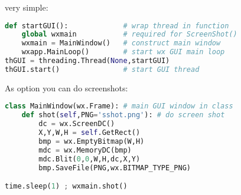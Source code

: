 very simple:
\begin{lstlisting}[language=python]
def startGUI():				# wrap thread in function
	global wxmain			# required for ScreenShot()
	wxmain = MainWindow()	# construct main window
	wxapp.MainLoop()		# start wx GUI main loop
thGUI = threading.Thread(None,startGUI)
thGUI.start()				# start GUI thread
\end{lstlisting}
As option you can do screenshots:
\begin{lstlisting}[language=python]
class MainWindow(wx.Frame): # main GUI window in class
	def shot(self,PNG='sshot.png'):	# do screen shot
		dc = wx.ScreenDC()
		X,Y,W,H = self.GetRect()
		bmp = wx.EmptyBitmap(W,H)
		mdc = wx.MemoryDC(bmp)
		mdc.Blit(0,0,W,H,dc,X,Y)
		bmp.SaveFile(PNG,wx.BITMAP_TYPE_PNG)

time.sleep(1) ; wxmain.shot()
\end{lstlisting}
